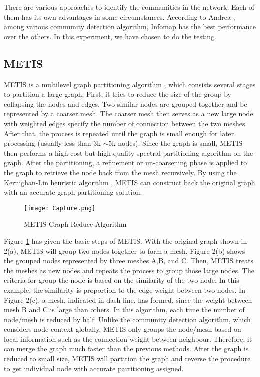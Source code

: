 There are various approaches to identify the communities in the network. Each of them has its own advantages in some circumstances. According to Andrea \cite{DBLP:conf/valuetools/FortunatoL09}, among various community detection algorithm, Infomap \cite{Rosvall2008} has the best performance over the others. In this experiment, we have chosen \cite{blondel2008fuc} to do the testing.


\subsection{METIS}

METIS is a multilevel graph partitioning algorithm \cite{DBLP:journals/siamsc/KarypisK98}, which consists several stages to partition a large graph. First, it tries to reduce the size of the group by collapsing the nodes and edges. Two similar nodes are grouped together and be represented by a coarser mesh. The coarser mesh then serves as a new large node with weighted edges specify the number of connection between the two meshes. After that, the process is repeated until the graph is small enough for later processing (usually less than $3$k $\sim 5$k nodes). Since the graph is small, METIS then performs a high-cost but high-quality spectral partitioning algorithm on the graph. After the partitioning, a refinement or un-coarsening phase is applied to the graph to retrieve the node back from the mesh recursively. By using the Kernighan-Lin heuristic algorithm \cite{kernighan_graph-partitioning1970}, METIS can construct back the original graph with an accurate graph partitioning solution.

\begin{figure}[t]
  \centering
  \texttt{[image: Capture.png]}
  \caption{METIS Graph Reduce Algorithm}\label{fig:Capture}
\end{figure}

Figure \ref{fig:Capture} has given the basic steps of METIS. With the original graph shown in 2(a), METIS will group two nodes together to form a mesh. Figure 2(b) shows the grouped nodes represented by three meshes A,B, and C. Then, METIS treats the meshes as new nodes and repeats the process to group those large nodes. The criteria for group the node is based on the similarity of the two node. In this example, the similarity is proportion to the edge weight between two nodes. In Figure 2(c), a mesh, indicated in dash line, has formed, since the weight between mesh B and C is large than others. In this algorithm, each time the number of node/mesh is reduced by half. Unlike the community detection algorithm, which considers node context globally, METIS only groups the node/mesh based on local information such as the connection weight between neighbour. Therefore, it can merge the graph much faster than the previous methods. After the graph is reduced to small size, METIS will partition the graph and reverse the procedure to get individual node with accurate partitioning assigned.


